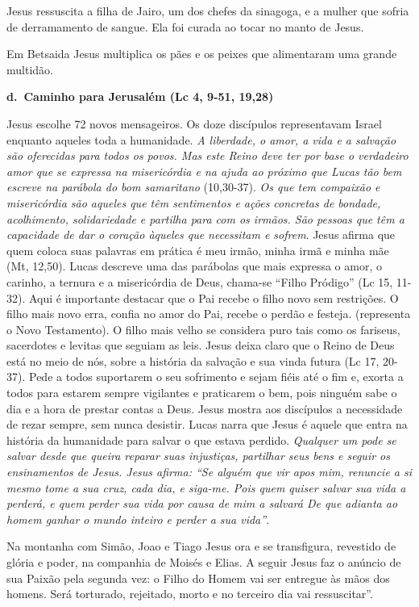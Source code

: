 \documentclass[
]{book}
\begin{document}
Jesus ressuscita a filha de Jairo, um dos chefes da sinagoga, e a mulher que sofria de derramamento de sangue. Ela foi curada ao tocar no manto de Jesus.

Em Betsaida Jesus multiplica os pães e os peixes que alimentaram uma grande multidão.

\textbf{d.~Caminho para Jerusalém (Lc 4, 9-51, 19,28)}

Jesus escolhe 72 novos mensageiros. Os doze discípulos representavam Israel enquanto aqueles toda a humanidade. \emph{A liberdade, o amor, a vida e a salvação são oferecidas para todos os povos. Mas este Reino deve ter por base o verdadeiro amor que se expressa na misericórdia e na ajuda ao próximo que Lucas tão bem escreve na parábola do bom samaritano} (10,30-37). \emph{Os que tem compaixão e misericórdia são aqueles que têm sentimentos e ações concretas de bondade, acolhimento, solidariedade e partilha para com os irmãos. São pessoas que têm a capacidade de dar o coração àqueles que necessitam e sofrem}. Jesus afirma que quem coloca suas palavras em prática é meu irmão, minha irmã e minha mãe (Mt, 12,50). Lucas descreve uma das parábolas que mais expressa o amor, o carinho, a ternura e a misericórdia de Deus, chama-se ``Filho Pródigo'' (Lc 15, 11-32). Aqui é importante destacar que o Pai recebe o filho novo sem restrições. O filho mais novo erra, confia no amor do Pai, recebe o perdão e festeja. (representa o Novo Testamento). O filho mais velho se considera puro tais como os fariseus, sacerdotes e levitas que seguiam as leis. Jesus deixa claro que o Reino de Deus está no meio de nós, sobre a história da salvação e sua vinda futura (Lc 17, 20-37). Pede a todos suportarem o seu sofrimento e sejam fiéis até o fim e, exorta a todos para estarem sempre vigilantes e praticarem o bem, pois ninguém sabe o dia e a hora de prestar contas a Deus. Jesus mostra aos discípulos a necessidade de rezar sempre, sem nunca desistir. Lucas narra que Jesus é aquele que entra na história da humanidade para salvar o que estava perdido. \emph{Qualquer um pode se salvar desde que queira reparar suas injustiças, partilhar seus bens e seguir os ensinamentos de Jesus. Jesus afirma: ``Se alguém que vir apos mim, renuncie a si mesmo tome a sua cruz, cada dia, e siga-me. Pois quem quiser salvar sua vida a perderá, e quem perder sua vida por causa de mim a salvará De que adianta ao homem ganhar o mundo inteiro e perder a sua vida''}.

Na montanha com Simão, Joao e Tiago Jesus ora e se transfigura, revestido de glória e poder, na companhia de Moisés e Elias. A seguir Jesus faz o anúncio de sua Paixão pela segunda vez: o Filho do Homem vai ser entregue às mãos dos homens. Será torturado, rejeitado, morto e no terceiro dia vai ressuscitar''.
\end{document}
